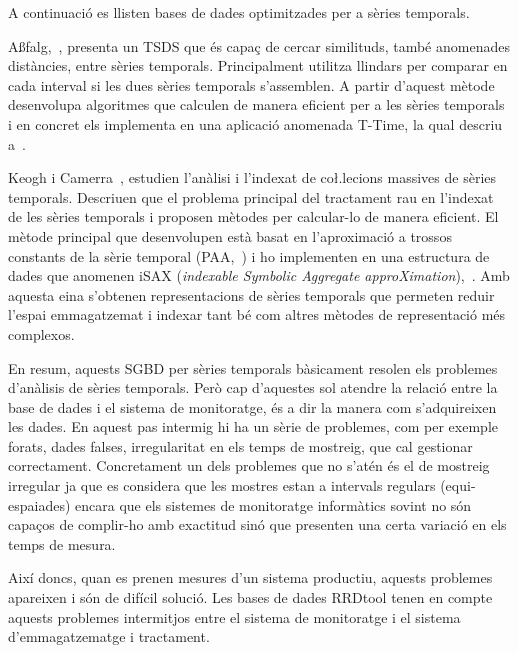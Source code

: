 A continuació es llisten  bases de dades optimitzades per a sèries temporals.

A{\ss}falg,~\cite{assfalg08:thesis}, presenta un TSDS que és capaç de
cercar similituds, també anomenades distàncies, entre sèries temporals. Principalment utilitza llindars per comparar en cada interval si les dues sèries temporals s'assemblen. A partir d'aquest mètode desenvolupa algoritmes que calculen de manera eficient per a les sèries temporals i en concret els implementa en una aplicació anomenada T-Time, la qual descriu a~\cite{assfalg08:ttime}.

Keogh i Camerra~\cite{keogh08:isax,keogh10:isax}, 
estudien l'anàlisi i l'indexat de co\l.lecions massives de sèries temporals. Descriuen que el problema principal del tractament rau en l'indexat de les sèries temporals i proposen mètodes per calcular-lo de manera eficient. El mètode principal que desenvolupen està basat en l'aproximació a trossos constants de la sèrie temporal (PAA,~\cite{keogh00}) i ho implementen en una estructura de dades que anomenen iSAX (\emph{indexable Symbolic Aggregate approXimation}),~\cite{isax}. Amb aquesta eina s'obtenen representacions de sèries temporals que permeten reduir l'espai emmagatzemat i indexar tant bé com altres mètodes de representació més complexos.




En resum, aquests SGBD per sèries temporals bàsicament resolen els problemes d'anàlisis de sèries temporals.
Però cap d'aquestes sol atendre la relació entre la base de dades i el sistema de monitoratge, és a dir la manera com s'adquireixen les dades. En aquest pas intermig hi ha un sèrie de problemes, com per exemple forats, dades falses, irregularitat en els temps de mostreig, que cal gestionar correctament. Concretament un dels problemes que no s'atén és el de mostreig irregular ja que es considera que les mostres estan a intervals regulars (equi-espaiades) encara que els sistemes de monitoratge informàtics sovint no són capaços de complir-ho amb exactitud sinó que presenten una certa variació en els temps de mesura. 

Així doncs, quan es prenen mesures d'un sistema productiu, aquests problemes apareixen i són de difícil solució.
Les bases de dades RRDtool tenen en compte aquests problemes intermitjos entre el sistema de monitoratge i el sistema d'emmagatzematge i tractament. 





